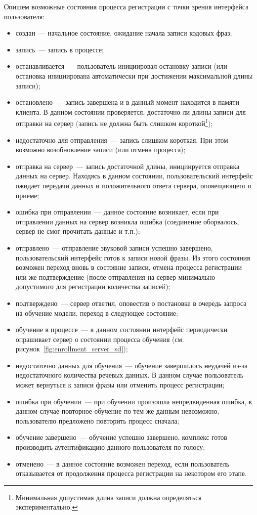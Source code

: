 Опишем возможные состояния процесса регистрации с точки зрения интерфейса
пользователя:

\begin{itemize}
\item создан~--- начальное состояние, ожидание начала записи кодовых фраз;
\item запись~--- запись в процессе;
\item останавливается~--- пользователь инициировал остановку записи (или
остановка инициирована автоматически при достижении максимальной длины записи);
\item остановлено~--- запись завершена и в данный момент находится в памяти
клиента. В данном состоянии проверяется, достаточно ли длины записи для отправки
на сервер (запись не должна быть слишком короткой\footnote{Минимальная
допустимая длина записи должна определяться экспериментально.});
\item недостаточно для отправления~--- запись слишком короткая. При этом
возможно возобновление записи (или отмена процесса);
\item отправка на сервер~--- запись достаточной длины, инициируется отправка
данных на сервер. Находясь в данном состоянии, пользовательский интерфейс
ожидает передачи данных и положительного ответа сервера, оповещающего о приеме;
\item ошибка при отправлении~--- данное состояние возникает, если при
отправлении данных на сервер возникла ошибка (соединение оборвалось, сервер не
смог прочитать данные и т.п.);
\item отправлено~--- отправление звуковой записи успешно завершено,
пользовательский интерфейс готов к записи новой фразы. Из этого состояния
возможен переход вновь в состояние записи, отмена процесса регистрации или же
подтверждение (после отправления на сервер минимально допустимого для
регистрации количества записей);
\item подтверждено~--- сервер ответил, оповестив о постановке в очередь запроса
на обучение модели, переход в следующее состояние;
\item обучение в процессе~--- в данном состоянии интерфейс периодически
опрашивает сервер о состоянии процесса обучения (см.
рисунок~\ref{fig:enrollment_server_sd});
\item недостаточно данных для обучения~--- обучение завершилось неудачей из-за
недостаточного количества речевых данных. В данном случае пользователь может
вернуться к записи фразы или отменить процесс регистрации;
\item ошибка при обучении~--- при обучении произошла непредвиденная ошибка, в
данном случае повторное обучение по тем же данным невозможно, пользователю
предложено повторить процесс сначала;
\item обучение завершено~--- обучение успешно завершено, комплекс готов
производить аутентификацию данного пользователя по голосу;
\item отменено~--- в данное состояние возможен переход, если пользователь
отказывается от продолжения процесса регистрации на некотором его этапе.
\end{itemize}

